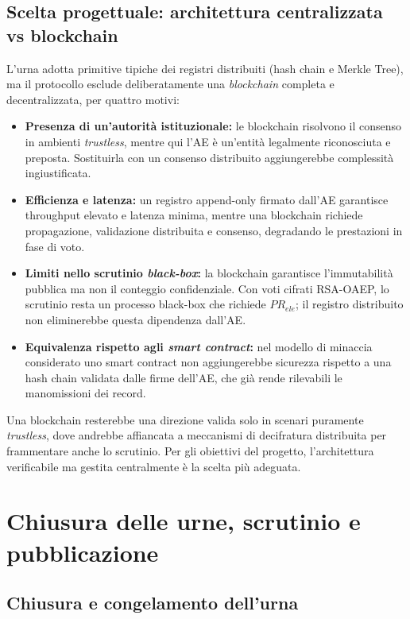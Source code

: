 \subsection{Scelta progettuale: architettura centralizzata vs blockchain}
\label{subsec:wp2_centralizzata_vs_blockchain}

L'urna adotta primitive tipiche dei registri distribuiti (hash chain e Merkle Tree), ma il protocollo esclude deliberatamente una \textit{blockchain} completa e decentralizzata, per quattro motivi:
\begin{itemize}
    \item \textbf{Presenza di un'autorità istituzionale:} le blockchain risolvono il consenso in ambienti \textit{trustless}, mentre qui l'AE è un'entità legalmente riconosciuta e preposta. Sostituirla con un consenso distribuito aggiungerebbe complessità ingiustificata.
    \item \textbf{Efficienza e latenza:} un registro append-only firmato dall'AE garantisce throughput elevato e latenza minima, mentre una blockchain richiede propagazione, validazione distribuita e consenso, degradando le prestazioni in fase di voto.
    \item \textbf{Limiti nello scrutinio \textit{black-box}:} la blockchain garantisce l'immutabilità pubblica ma non il conteggio confidenziale. Con voti cifrati RSA-OAEP, lo scrutinio resta un processo black-box che richiede $PR_{ele}$; il registro distribuito non eliminerebbe questa dipendenza dall'AE.
    \item \textbf{Equivalenza rispetto agli \textit{smart contract}:} nel modello di minaccia considerato uno smart contract non aggiungerebbe sicurezza rispetto a una hash chain validata dalle firme dell'AE, che già rende rilevabili le manomissioni dei record.
\end{itemize}
Una blockchain resterebbe una direzione valida solo in scenari puramente \textit{trustless}, dove andrebbe affiancata a meccanismi di decifratura distribuita per frammentare anche lo scrutinio. Per gli obiettivi del progetto, l'architettura verificabile ma gestita centralmente è la scelta più adeguata.


\section{Chiusura delle urne, scrutinio e pubblicazione}
\label{sec:scrutinio_pubblicazione}

\subsection{Chiusura e congelamento dell'urna}
\label{subsec:wp2_chiusura}

